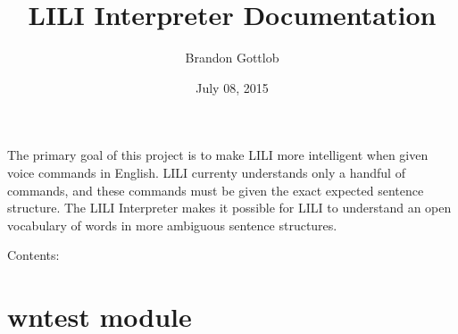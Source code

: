 \documentclass[letterpaper,10pt,english]{sphinxmanual}
\title{LILI Interpreter Documentation}
\date{July 08, 2015}
\author{Brandon Gottlob}
\begin{document}
\maketitle
\tableofcontents
{}\label{index::doc}


The primary goal of this project is to make LILI more intelligent when given voice commands in English. LILI currenty understands only a handful of commands, and these commands must be given the exact expected sentence structure. The LILI Interpreter makes it possible for LILI to understand an open vocabulary of words in more ambiguous sentence structures.

Contents:


\chapter{wntest module}
\label{wntest:welcome-to-lili-interpreter-s-documentation}\label{wntest:module-semsim.wntest}\label{wntest::doc}\label{wntest:wntest-module}
\end{document}
